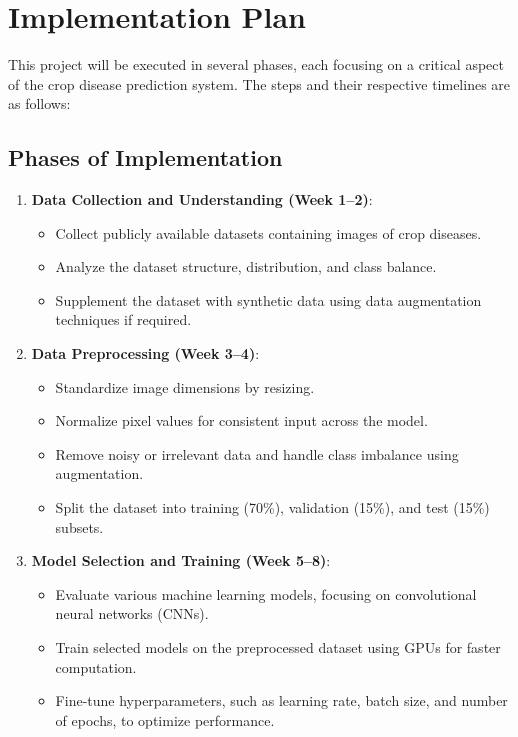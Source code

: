 \section{Implementation Plan}
This project will be executed in several phases, each focusing on a critical aspect of the crop disease prediction system. The steps and their respective timelines are as follows:

\subsection{Phases of Implementation}
\begin{enumerate}
    \item \textbf{Data Collection and Understanding (Week 1–2)}:
    \begin{itemize}
        \item Collect publicly available datasets containing images of crop diseases.
        \item Analyze the dataset structure, distribution, and class balance.
        \item Supplement the dataset with synthetic data using data augmentation techniques if required.
    \end{itemize}

    \item \textbf{Data Preprocessing (Week 3–4)}:
    \begin{itemize}
        \item Standardize image dimensions by resizing.
        \item Normalize pixel values for consistent input across the model.
        \item Remove noisy or irrelevant data and handle class imbalance using augmentation.
        \item Split the dataset into training (70\%), validation (15\%), and test (15\%) subsets.
    \end{itemize}

    \item \textbf{Model Selection and Training (Week 5–8)}:
    \begin{itemize}
        \item Evaluate various machine learning models, focusing on convolutional neural networks (CNNs).
        \item Train selected models on the preprocessed dataset using GPUs for faster computation.
        \item Fine-tune hyperparameters, such as learning rate, batch size, and number of epochs, to optimize performance.
    \end{itemize}


\end{enumerate}
